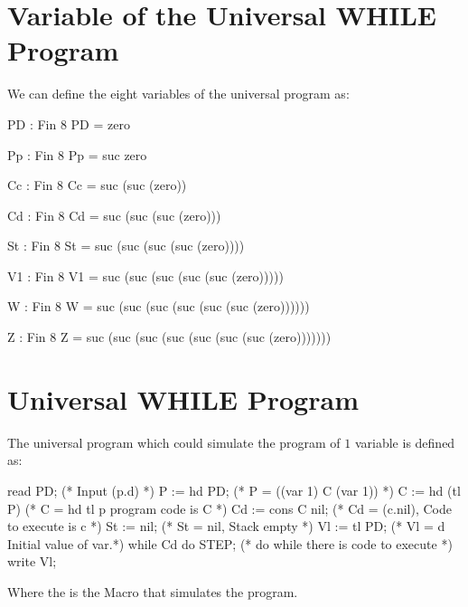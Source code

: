 \section{Variable of the Universal WHILE Program}\label{appendix:variable of u}
We can define the eight variables of the universal \WHILE program as:
\begin{code}[fontsize=\footnotesize]
PD : Fin 8
PD = zero

Pp : Fin 8
Pp = suc zero

Cc : Fin 8
Cc = suc (suc (zero))

Cd : Fin 8
Cd = suc (suc (suc (zero)))

St : Fin 8
St = suc (suc (suc (suc (zero))))

V1 : Fin 8
V1 = suc (suc (suc (suc (suc (zero)))))

W : Fin 8
W = suc (suc (suc (suc (suc (suc (zero))))))

Z : Fin 8
Z = suc (suc (suc (suc (suc (suc (suc (zero)))))))
\end{code}
\section{Universal WHILE Program}\label{appendix:universal while}
The universal \WHILE program which could simulate the \WHILE program of $1$ variable is defined as:
\begin{code}
read PD;             (* Input (p.d) *)
  P := hd PD;        (* P = ((var 1) C (var 1)) *)
  C := hd (tl P)     (* C = hd tl p program code is C *)
  Cd := cons C nil;  (* Cd = (c.nil), Code to execute is c *)
  St := nil;         (* St = nil, Stack empty *)
  Vl := tl PD;       (* Vl = d Initial value of var.*)
  while Cd do STEP;  (* do while there is code to execute *)
write Vl;
\end{code}
Where the  is the Macro that simulates the program.

